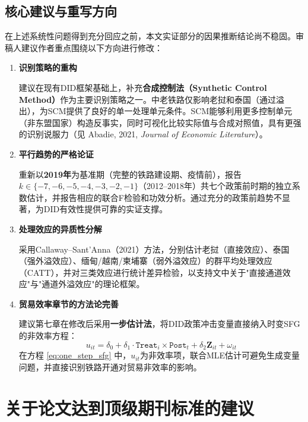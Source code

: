 \documentclass[12pt, a4paper]{article}
\begin{document}
\subsection{核心建议与重写方向}

在上述系统性问题得到充分回应之前，本文实证部分的因果推断结论尚不稳固。审稿人建议作者重点围绕以下方向进行修改：

\begin{enumerate}[leftmargin=2em, label=\textbf{方向\arabic*：}]
  \item \textbf{识别策略的重构}

    建议在现有DID框架基础上，补充\textbf{合成控制法（Synthetic Control Method）}作为主要识别策略之一。中老铁路仅影响老挝和泰国（通过溢出），为SCM提供了良好的单一处理单元条件。SCM能够利用更多控制单元（非东盟国家）构造反事实，同时可视化比较实际值与合成对照值，具有更强的识别说服力（见 Abadie, 2021, \textit{Journal of Economic Literature}）。

  \item \textbf{平行趋势的严格论证}

    重新以\textbf{2019年}为基准期（完整的铁路建设期、疫情前），报告$k \in \{-7, -6, -5, -4, -3, -2, -1\}$（2012--2018年）共七个政策前时期的独立系数估计，并报告相应的联合F检验和功效分析。通过充分的政策前趋势不显著，为DID有效性提供可靠的实证支撑。

  \item \textbf{处理效应的异质性分解}

    采用Callaway--Sant'Anna（2021）方法，分别估计老挝（直接效应）、泰国（强外溢效应）、缅甸/越南/柬埔寨（弱外溢效应）的群平均处理效应（CATT），并对三类效应进行统计差异检验，以支持文中关于"直接通道效应"与"通道外溢效应"的理论框架。

  \item \textbf{贸易效率章节的方法论完善}

    建议第七章在修改后采用\textbf{一步估计法}，将DID政策冲击变量直接纳入时变SFG的非效率方程：
    \begin{equation}
      u_{it} = \delta_0 + \delta_1 \cdot \texttt{Treat}_i \times \texttt{Post}_t + \delta_2 \mathbf{Z}_{it} + \omega_{it}
      \label{eq:one_step_sfg}
    \end{equation}
    在方程 \eqref{eq:one_step_sfg} 中，$u_{it}$为非效率项，联合MLE估计可避免生成变量问题，并直接识别铁路开通对贸易非效率的影响。
\end{enumerate}

\section{关于论文达到顶级期刊标准的建议}
\end{document}
